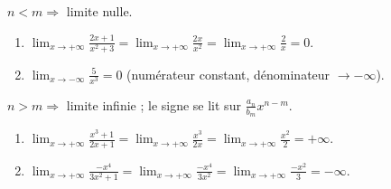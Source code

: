 \documentclass[11pt,a4paper]{article}
\begin{document}
\begin{correction}
$n<m\Rightarrow$ limite nulle.
\begin{enumerate}[label=\alph*),leftmargin=2em,itemsep=3pt]
  \item $\displaystyle\lim_{x\to+\infty}\frac{2x+1}{x^2+3}=\lim_{x\to+\infty}\frac{2x}{x^2}=\lim_{x\to+\infty}\frac{2}{x}=0$.
  \item $\displaystyle\lim_{x\to-\infty}\frac{5}{x^3}=0$ (numérateur constant, dénominateur $\to-\infty$).
\end{enumerate}
\end{correction}

\begin{correction}
$n>m\Rightarrow$ limite infinie ; le signe se lit sur $\frac{a_n}{b_m}x^{n-m}$.
\begin{enumerate}[label=\alph*),leftmargin=2em,itemsep=3pt]
  \item $\displaystyle\lim_{x\to+\infty}\frac{x^3+1}{2x+1}=\lim_{x\to+\infty}\frac{x^3}{2x}=\lim_{x\to+\infty}\frac{x^2}{2}=+\infty$.
  \item $\displaystyle\lim_{x\to+\infty}\frac{-x^4}{3x^2+1}=\lim_{x\to+\infty}\frac{-x^4}{3x^2}=\lim_{x\to+\infty}\frac{-x^2}{3}=-\infty$.
\end{enumerate}
\end{correction}
\end{document}
